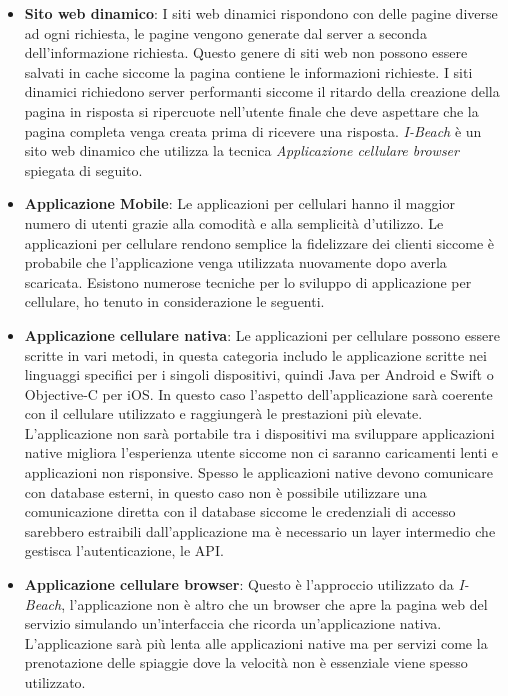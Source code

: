 \begin{itemize}
    Questo approccio necessit\`a di API pubbliche accessibili da parte del client.
    \item \textbf{Sito web dinamico}: I siti web dinamici rispondono con delle pagine diverse ad ogni richiesta, le pagine vengono generate dal server a seconda dell'informazione richiesta. Questo genere di siti web non possono essere salvati in cache siccome la pagina contiene le informazioni richieste. I siti dinamici richiedono server performanti siccome il ritardo della creazione della pagina in risposta si ripercuote nell'utente finale che deve aspettare che la pagina completa venga creata prima di ricevere una risposta. \emph{I-Beach} \`e un sito web dinamico che utilizza la tecnica \textit{Applicazione cellulare browser} spiegata di seguito.
    \item \textbf{Applicazione Mobile}: Le applicazioni per cellulari hanno il maggior numero di utenti grazie alla comodit\`a e alla semplicit\`a d'utilizzo. Le applicazioni per cellulare rendono semplice la fidelizzare dei clienti siccome \`e probabile che l'applicazione venga utilizzata nuovamente dopo averla scaricata. Esistono numerose tecniche per lo sviluppo di applicazione per cellulare, ho tenuto in considerazione le seguenti.
    \item \textbf{Applicazione cellulare nativa}: Le applicazioni per cellulare possono essere scritte in vari metodi, in questa categoria includo le applicazione scritte nei linguaggi specifici per i singoli dispositivi, quindi Java per Android e Swift o Objective-C per iOS. In questo caso l'aspetto dell'applicazione sar\`a coerente con il cellulare utilizzato e raggiunger\`a le prestazioni pi\`u elevate. L'applicazione non sar\`a portabile tra i dispositivi ma sviluppare applicazioni native migliora l'esperienza utente siccome non ci saranno caricamenti lenti e applicazioni non risponsive. Spesso le applicazioni native devono comunicare con database esterni, in questo caso non \`e possibile utilizzare una comunicazione diretta con il database siccome le credenziali di accesso sarebbero estraibili dall'applicazione ma \`e necessario un layer intermedio che gestisca l'autenticazione, le API.
    \item \textbf{Applicazione cellulare browser}: Questo \`e l'approccio utilizzato da \emph{I-Beach}, l'applicazione non \`e altro che un browser che apre la pagina web del servizio simulando un'interfaccia che ricorda un'applicazione nativa. L'applicazione sar\`a pi\`u lenta alle applicazioni native ma per servizi come la prenotazione delle spiaggie dove la velocit\`a non \`e essenziale viene spesso utilizzato.

\end{itemize}
